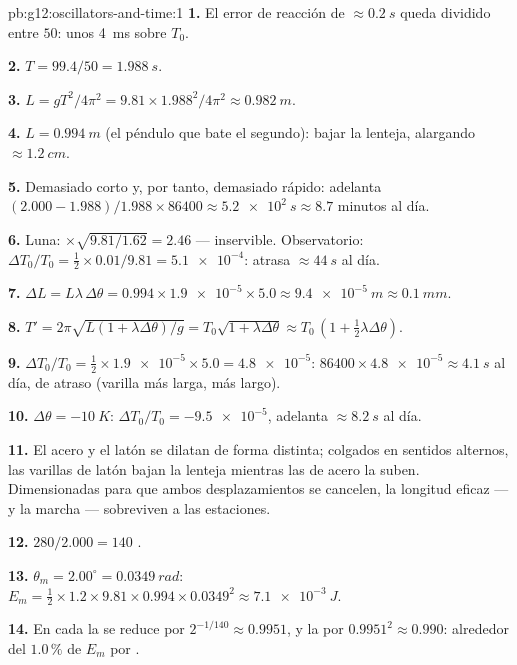\begin{solution}{pb:g12:oscillators-and-time:1}
\textbf{1.} El error de reacción de $\approx \qty{0.2}{s}$ queda
dividido entre $50$: unos \qty{4}{ms} sobre $T_0$.

\textbf{2.} $T = 99.4/50 = \qty{1.988}{s}$.

\textbf{3.} $L = gT^2/4\pi^2 = 9.81 \times 1.988^2/4\pi^2 \approx
\qty{0.982}{m}$.

\textbf{4.} $L = \qty{0.994}{m}$ (el péndulo que bate el segundo): bajar
la lenteja, alargando $\approx \qty{1.2}{cm}$.

\textbf{5.} Demasiado corto y, por tanto, demasiado rápido: adelanta
$(2.000 - 1.988)/1.988 \times 86400 \approx \qty{5.2e2}{s} \approx 8.7$
minutos al día.

\textbf{6.} Luna: $\times\sqrt{9.81/1.62} = 2.46$ --- inservible.
Observatorio: $\Delta T_0/T_0 = \tfrac12 \times 0.01/9.81 =
\num{5.1e-4}$: atrasa $\approx \qty{44}{s}$ al día.

\textbf{7.} $\Delta L = L\lambda\,\Delta\theta = 0.994 \times
\num{1.9e-5} \times 5.0 \approx \qty{9.4e-5}{m} \approx \qty{0.1}{mm}$.

\textbf{8.} $T' = 2\pi\sqrt{L(1 + \lambda\Delta\theta)/g} =
T_0\sqrt{1 + \lambda\Delta\theta} \approx T_0\,(1 + \tfrac12
\lambda\Delta\theta)$.

\textbf{9.} $\Delta T_0/T_0 = \tfrac12 \times \num{1.9e-5} \times 5.0 =
\num{4.8e-5}$: $86400 \times \num{4.8e-5} \approx \qty{4.1}{s}$ al día,
de atraso (varilla más larga,  más largo).

\textbf{10.} $\Delta\theta = \qty{-10}{K}$:
$\Delta T_0/T_0 = \num{-9.5e-5}$, adelanta $\approx \qty{8.2}{s}$ al
día.

\textbf{11.} El acero y el latón se dilatan de forma distinta; colgados
en sentidos alternos, las varillas de latón bajan la lenteja mientras
las de acero la suben. Dimensionadas para que ambos desplazamientos se
cancelen, la longitud eficaz --- y la marcha --- sobreviven a las
estaciones.

\textbf{12.} $280/2.000 = 140$ .

\textbf{13.} $\theta_m = 2.00^\circ = \qty{0.0349}{rad}$:
$E_m = \tfrac12 \times 1.2 \times 9.81 \times 0.994 \times 0.0349^2
\approx \qty{7.1e-3}{J}$.

\textbf{14.} En cada  la  se reduce por
$2^{-1/140} \approx 0.9951$, y la  por $0.9951^2 \approx 0.990$:
alrededor del $1.0\,\%$ de $E_m$ por .


\end{solution}
